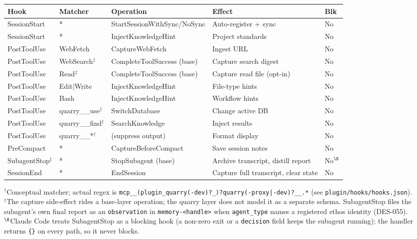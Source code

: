 \documentclass[a4paper,10pt,fleqn]{article}
\begin{document}
{\small
\begin{tabular}{llp{3.2cm}p{2.8cm}l}
\hline
\textbf{Hook} & \textbf{Matcher} & \textbf{Operation} &
  \textbf{Effect} & \textbf{Blk} \\
\hline
SessionStart & * & StartSession\-WithSync/\-NoSync &
  Auto-register + sync & No \\
SessionStart & * & InjectKnowledge\-Hint &
  Project standards & No \\
PostToolUse & WebFetch & CaptureWebFetch &
  Ingest URL & No \\
PostToolUse & WebSearch$^\ddagger$ & CompleteTool\-Success (base) &
  Capture search digest & No \\
PostToolUse & Read$^\ddagger$ & CompleteTool\-Success (base) &
  Capture read file (opt-in) & No \\
PostToolUse & Edit|Write & InjectKnowledge\-Hint &
  File-type hints & No \\
PostToolUse & Bash & InjectKnowledge\-Hint &
  Workflow hints & No \\
PostToolUse & quarry\_\_use$^\dagger$ & SwitchDatabase &
  Change active DB & No \\
PostToolUse & quarry\_\_find$^\dagger$ & SearchKnowledge &
  Inject results & No \\
PostToolUse & quarry\_\_*$^\dagger$ & (suppress output) &
  Format display & No \\
PreCompact & * & CaptureBefore\-Compact &
  Save session notes & No \\
SubagentStop$^\ddagger$ & * & StopSubagent (base) &
  Archive transcript, distill report & No$^\S$ \\
SessionEnd & * & EndSession &
  Capture full transcript, clear state & No \\
\hline
\end{tabular}
}

\noindent
$^\dagger$Conceptual matcher; actual regex is
\texttt{mcp\_\_(plugin\_quarry(-dev)?\_)?quarry(-proxy|-dev)?\_\_.*}
(see \texttt{plugin/hooks/hooks.json}).\\
$^\ddagger$The capture side-effect rides a base-layer operation; the
quarry layer does not model it as a separate schema. SubagentStop
files the subagent's own final report as an \texttt{observation} in
\texttt{memory-<handle>} when \texttt{agent\_type} names a registered
ethos identity (DES-055).\\
$^\S$Claude Code treats SubagentStop as a blocking hook (a non-zero
exit or a \texttt{decision} field keeps the subagent running); the
handler returns \texttt{\{\}} on every path, so it never blocks.
\end{document}
